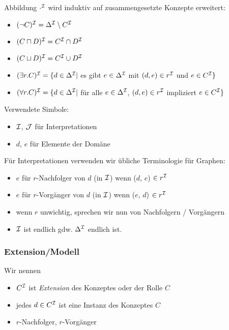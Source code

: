 \noindent Abbildung $\cdot^{\mathcal{I}}$ wird induktiv auf zusammengesetzte Konzepte erweitert:

\begin{itemize}
  \item $(\neg C)^{\mathcal{I}} = \Delta^{\mathcal{I}} \setminus C^{\mathcal{I}}$
  \item $(C \sqcap D)^{\mathcal{I}} = C^{\mathcal{I}} \cap D^{\mathcal{I}}$
  \item $(C \sqcup D)^{\mathcal{I}} = C^{\mathcal{I}} \cup D^{\mathcal{I}}$
  \item $(\exists r.C)^{\mathcal{I}} = \{d \in \Delta^{\mathcal{I}} |$ es gibt $ e \in \Delta^{\mathcal{I}}$ mit $(d,e) \in r^{\mathcal{I}}$ und $e \in C^{\mathcal{I}}\}$
  \item $(\forall r.C)^{\mathcal{I}} = \{d \in \Delta^{\mathcal{I}} |$ für alle $ e \in \Delta^{\mathcal{I}}$, $(d,e) \in r^{\mathcal{I}}$ impliziert $e \in C^{\mathcal{I}}\}$
\end{itemize}

Verwendete Simbole:

\begin{itemize}
  \item $\mathcal{I}$, $\mathcal{J}$ für Interpretationen
  \item $d$, $e$ für Elemente der Domäne
\end{itemize}

Für Interpretationen verwenden wir übliche Terminologie für Graphen:

\begin{itemize}
  \item $e$ für $r$-Nachfolger von $d$ (in $\mathcal{I}$) wenn ($d$, $e$) $\in r^{\mathcal{I}}$
  \item $e$ für $r$-Vorgänger von $d$ (in $\mathcal{I}$) wenn ($e$, $d$) $\in r^{\mathcal{I}}$
  \item wenn $r$ unwichtig, sprechen wir nun von Nachfolgern / Vorgängern
  \item $\mathcal{I}$ ist endlich gdw. $\Delta^{\mathcal{I}}$ endlich ist.
\end{itemize}

\subsubsection{Extension/Modell}\label{exetension}

Wir nennen

\begin{itemize}
\item
  $C^{\mathcal{I}}$ ist \emph{Extension} des Konzeptes oder der Rolle $C$
\item
  jedes $d \in C^{\mathcal{I}}$ ist eine Instanz des Konzeptes $C$
\item
  $r$-Nachfolger, $r$-Vorgänger
\end{itemize}

